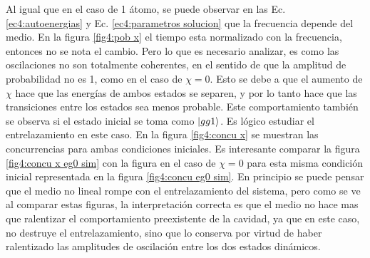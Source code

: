 Al igual que en el caso de 1 átomo, se puede observar en las Ec. \ref{ec4:autoenergias} y Ec. \ref{ec4:parametros solucion} que la frecuencia depende del medio. En la figura \ref{fig4:pob x} el tiempo esta normalizado con la frecuencia, entonces no se nota el cambio. Pero lo que es necesario analizar, es como las oscilaciones no son totalmente coherentes, en el sentido de que la amplitud de probabilidad no es 1, como en el caso de $\chi=0$. Esto se debe a que el aumento de $\chi$ hace que las energías de ambos estados se separen, y por lo tanto hace que las transiciones entre los estados sea menos probable. Este comportamiento también se observa si el estado inicial se toma como $\ket{gg1}$. Es lógico estudiar el entrelazamiento en este caso. En la figura \ref{fig4:concu x} se muestran las concurrencias para ambas condiciones iniciales. Es interesante comparar la figura \ref{fig4:concu x eg0 sim} con la figura en el caso de $\chi=0$ para esta misma condición inicial representada en la figura \ref{fig4:concu eg0 sim}. En principio se puede pensar que el medio no lineal rompe con el entrelazamiento del sistema, pero como se ve al comparar estas figuras, la interpretación correcta es que el medio no hace mas que ralentizar el comportamiento preexistente de la cavidad, ya que en este caso, no destruye el entrelazamiento, sino que lo conserva por virtud de haber ralentizado las amplitudes de oscilación entre los dos estados dinámicos.
